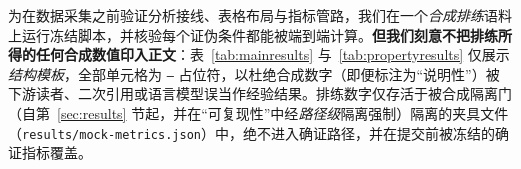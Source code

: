 \documentclass[11pt]{ctexart}
\begin{document}
为在数据采集之前验证分析接线、表格布局与指标管路，我们在一个\emph{合成排练}语料上运行冻结脚本，并核验每个证伪条件都能被端到端计算。\textbf{但我们刻意不把排练所得的任何合成数值印入正文}：表~\ref{tab:mainresults} 与~\ref{tab:propertyresults} 仅展示\emph{结构模板}，全部单元格为 \texttt{--} 占位符，以杜绝合成数字（即便标注为“说明性”）被下游读者、二次引用或语言模型误当作经验结果。排练数字仅存活于被合成隔离门（自第~\ref{sec:results} 节起，并在“可复现性”中经\emph{路径级}隔离强制）隔离的夹具文件（\texttt{results/mock-metrics.json}）中，绝不进入确证路径，并在提交前被冻结的确证指标覆盖。

\begin{table}[t]
\centering
\caption{主结果的\emph{结构模板}。所有单元格显示为 \texttt{--} 占位符：本协议快照下\emph{没有}可报告的确证数字，我们刻意不填入任何合成数值，以杜绝被误读为经验结果。真实值将在取得同意的数据被独立标注后由冻结脚本填入。新增的 J1-DT 行为确定性工具增强裁判基线。UPT 表示不安全正向转移率（即 $H_{\mathrm{FA}}$）；Coverage 为自动化覆盖率；AURC 与 ECE 为系统内摘要。}
\label{tab:mainresults}
\end{table}

\begin{table}[t]
\centering
\caption{属性级结构模板。所有单元格显示为 \texttt{--} 占位符；本协议快照下无任何经验数字，真实值将由冻结脚本在确证数据到达后填入。}
\label{tab:propertyresults}
\end{table}
\end{document}
